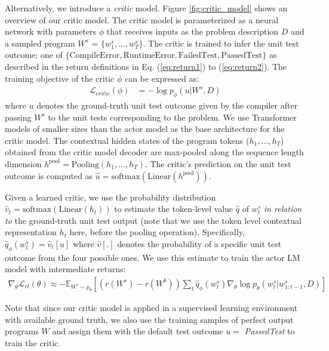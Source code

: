 \documentclass{article}
\begin{document}
Alternatively, we introduce a \emph{critic} model.
Figure \ref{fig:critic_model} shows an overview of our critic model.
The critic model is parameterized as a neural network with parameters $\phi$ that receives inputs as the problem description $D$ and a sampled program $W^s$ = $\{w^s_{1}, \dots, w^s_{T} \}$.
The critic is trained to infer the unit test outcome; one of $\{\mathrm{CompileError, RuntimeError, FailedTest, PassedTest}\}$ as described in the return definitions in Eq. (\ref{eq:return1}) to (\ref{eq:return2}). The training objective of the critic $\phi$ can be expressed as: 
\begin{align}
    \mathcal{L}_{critic}(\phi) &= -\log p_\phi (u| W^s, D) \label{eq:critic_obj}
\end{align}
where $u$ denotes the ground-truth unit test outcome given by the compiler after passing $W^s$ to the unit tests corresponding to the problem.
We use Transformer models of smaller sizes than the actor model as the base architecture for the critic model. The contextual hidden states of the program tokens ($h_1, \dots, h_T$) obtained from the critic model decoder are max-pooled along the sequence length dimension $h^\mathrm{pool} = \mathrm{Pooling}(h_1, \dots, h_T)$. 
The critic's prediction on the unit test outcome is computed as $\hat{u} = \mathrm{softmax}(\mathrm{Linear}(h^\mathrm{pool}))$.

Given a learned critic, we use the probability distribution $\hat{v}_t = \mathrm{softmax}(\mathrm{Linear}(h_{t}))$ to estimate the token-level value $\hat{q}$ of $w^s_t$ \emph{in relation to} the ground-truth unit test output (note that we use the token level contextual representation $h_t$ here, before the pooling operation). Specifically, $\hat{q}_\phi(w^s_t) = \hat{v}_{t}[u]$ where $\hat{v}[.]$ denotes the probability of a specific unit test outcome from the four possible ones. We use this estimate to train the actor LM model with intermediate returns:
\begin{align}
    \nabla_\theta \mathcal{L}_{rl}(\theta) \approx -\mathbb{E}_{W^s \sim p_\theta} [(r(W^s)-r(W^b))  \sum_t \hat{q}_\phi(w^s_t) \nabla_\theta \log p_\theta(w^s_t|w^s_{1:t-1}, D)]
    \label{eq:rl_loss_final}
\end{align}




Note that since our critic model is applied in a supervised learning environment with available ground truth, we also use the training samples of perfect output programs $W$ and assign them with the default test outcome $u = $ \emph{PassedTest} to train the critic.
\end{document}
